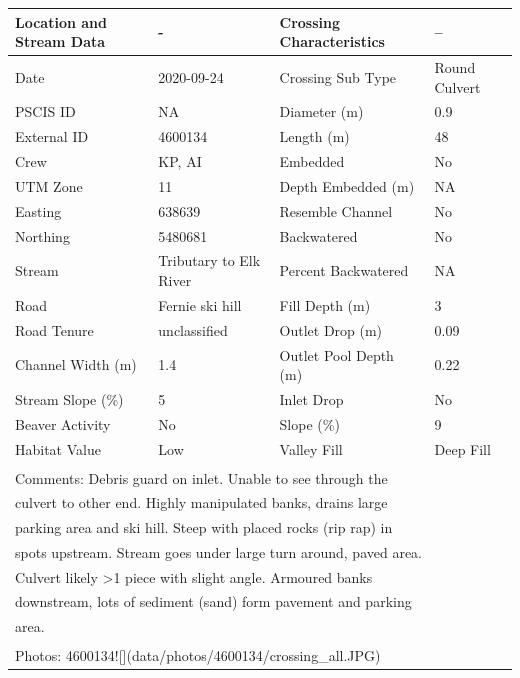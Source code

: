 \documentclass[
]{book}
\begin{document}
\begin{tabular}{l|l|l|l}
\hline
Location and Stream Data & - & Crossing Characteristics & --\\
\hline
Date & 2020-09-24 & Crossing Sub Type & Round Culvert\\
\hline
PSCIS ID & NA & Diameter (m) & 0.9\\
\hline
External ID & 4600134 & Length (m) & 48\\
\hline
Crew & KP, AI & Embedded & No\\
\hline
UTM Zone & 11 & Depth Embedded (m) & NA\\
\hline
Easting & 638639 & Resemble Channel & No\\
\hline
Northing & 5480681 & Backwatered & No\\
\hline
Stream & Tributary to Elk River & Percent Backwatered & NA\\
\hline
Road & Fernie ski hill & Fill Depth (m) & 3\\
\hline
Road Tenure & unclassified & Outlet Drop (m) & 0.09\\
\hline
Channel Width (m) & 1.4 & Outlet Pool Depth (m) & 0.22\\
\hline
Stream Slope (\%) & 5 & Inlet Drop & No\\
\hline
Beaver Activity & No & Slope (\%) & 9\\
\hline
Habitat Value & Low & Valley Fill & Deep Fill\\
\hline
\multicolumn{4}{l}{\textsuperscript{} Comments: Debris guard on inlet. Unable to see through the}\\
\multicolumn{4}{l}{culvert to other end. Highly manipulated banks, drains large}\\
\multicolumn{4}{l}{parking area and ski hill. Steep with placed rocks (rip rap) in}\\
\multicolumn{4}{l}{spots upstream. Stream goes under large turn around, paved area.}\\
\multicolumn{4}{l}{Culvert likely >1 piece with slight angle. Armoured banks}\\
\multicolumn{4}{l}{downstream, lots of sediment (sand) form pavement and parking}\\
\multicolumn{4}{l}{area.}\\
\multicolumn{4}{l}{\textsuperscript{} Photos: 4600134![](data/photos/4600134/crossing\_all.JPG)}\\
\end{tabular}
\end{document}
